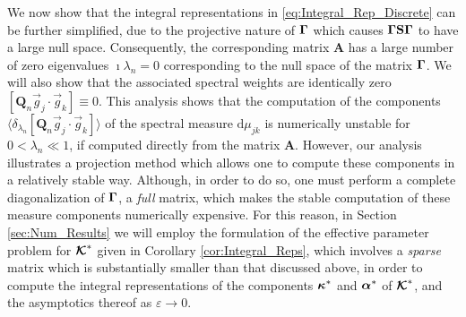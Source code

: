 \documentclass[11pt]{amsart}
\renewcommand{\d}{\mathrm{d}}
\newcommand{\Sb}{\mathbf{S}}
\newcommand{\Ab}{\mathbf{A}}
\newcommand{\Qb}{\mathbf{Q}}
\newcommand\Kbc{\mbox{\boldmath${\mathcal{K}}$}}
\newcommand\balpha{\mbox{\boldmath${\alpha}$}}
\newcommand\bkappa{\mbox{\boldmath${\kappa}$}}
\newcommand\bGamma{\mbox{\boldmath${\Gamma}$}}
\begin{document}
We now show that the integral representations in
\eqref{eq:Integral_Rep_Discrete} can be further 
simplified, due to the projective nature of $\bGamma$ which causes
$\bGamma\Sb\bGamma$ to have a large null space. Consequently, the
corresponding matrix $\Ab$ has a large number of zero eigenvalues
$\imath\lambda_n=0$ corresponding to the null space of the matrix
$\bGamma$. We will also show that the associated 
spectral weights are identically zero $[\Qb_n\vec{g}_j\cdot\vec{g}_k]\equiv0$. This 
analysis shows that the computation of the components
$\langle\delta_{\lambda_n}[\Qb_n\vec{g}_j\cdot\vec{g}_k]\rangle$ of the spectral measure $\d\mu_{jk}$
is numerically unstable for $0<\lambda_n\ll1$, if computed directly from the
matrix $\Ab$. However, our analysis illustrates a projection method
which allows one to compute these components in a relatively stable
way. Although, in order to do so, one must perform a complete
diagonalization of $\bGamma$, a \emph{full} matrix, which makes the
stable computation of these measure components numerically
expensive. For this reason, in Section \ref{sec:Num_Results} we will
employ the formulation of the effective parameter problem for $\Kbc^*$
given in Corollary \ref{cor:Integral_Reps}, which involves a
\emph{sparse} matrix which is substantially smaller than that
discussed above, in order to compute the integral representations of
the components $\bkappa^*$ and $\balpha^*$ of $\Kbc^*$, and the
asymptotics thereof as $\varepsilon\to0$.  
\end{document}
